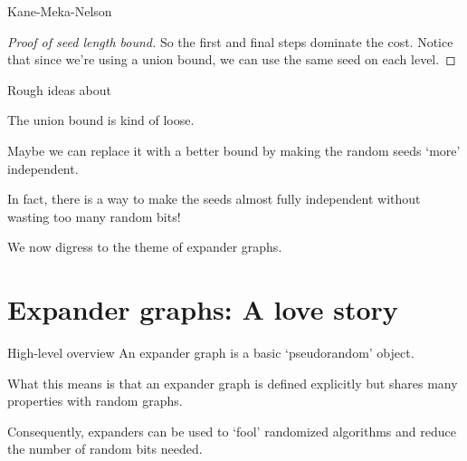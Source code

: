 \documentclass[10pt]{beamer}
\begin{document}
\begin{frame}[allowframebreaks]{Kane-Meka-Nelson}
\begin{proof}[Proof of seed length bound]
    \bigskip
    So the first and final steps dominate the cost.
    Notice that since we're using a union bound, we can use the same
    seed on each level.
  \end{proof}

\end{frame}

\begin{frame}{Rough ideas about \cite{kane2011almost}}

  The union bound is kind of loose.

  \pause\bigskip\bigskip

  Maybe we can replace it with a better bound by making the random seeds
  `more' independent.

  \pause\bigskip\bigskip

  In fact, there is a way to make the seeds almost fully independent
  without wasting too many random bits!

  \pause\bigskip\bigskip

  We now digress to the theme of expander graphs.

\end{frame}


\section{Expander graphs: A love story}

\begin{frame}
  \sectionpage
\end{frame}

\begin{frame}{High-level overview}
  An expander graph is a basic `pseudorandom' object.

  \pause\bigskip\bigskip

  What this means is that an expander graph is defined explicitly but
  shares many properties with random graphs.

  \pause\bigskip\bigskip

  Consequently, expanders can be used to `fool' randomized algorithms
  and reduce the number of random bits needed.
\end{frame}
\end{document}
